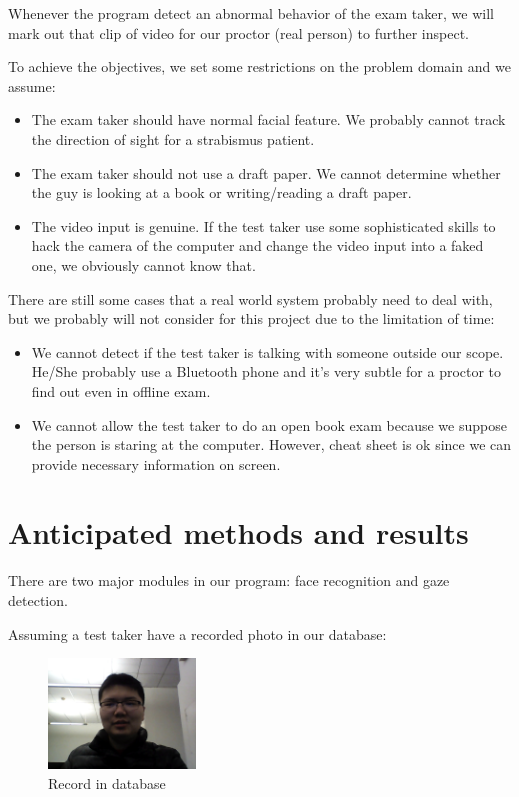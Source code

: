 \documentclass[11pt,letterpaper]{article}
\begin{document}
Whenever the program detect an abnormal behavior of the exam taker, we will mark out that clip of video for our proctor (real person) to further inspect.

To achieve the objectives, we set some restrictions on the problem domain and we assume:

\begin{itemize}
\item The exam taker should have normal facial feature. We probably cannot track the direction of sight for a strabismus patient.
\item The exam taker should not use a draft paper. We cannot determine whether the guy is looking at a book or writing/reading a draft paper.
\item The video input is genuine. If the test taker use some sophisticated skills to hack the camera of the computer and change the video input into a faked one, we obviously cannot know that.
\end{itemize}

There are still some cases that a real world system probably need to deal with, but we probably will not consider for this project due to the limitation of time:

\begin{itemize}
\item We cannot detect if the test taker is talking with someone outside our scope. He/She probably use a Bluetooth phone and it’s very subtle for a proctor to find out even in offline exam.
\item We cannot allow the test taker to do an open book exam because we suppose the person is staring at the computer. However, cheat sheet is ok since we can provide necessary information on screen.
\end{itemize}

\pagebreak
\section{Anticipated methods and results}

There are two major modules in our program: face recognition and gaze detection.

Assuming a test taker have a recorded photo in our database:

\begin{figure}[htb!]
  \centering
    \includegraphics[width=0.35\textwidth]{record}
	\caption{Record in database}
\end{figure}
\end{document}
